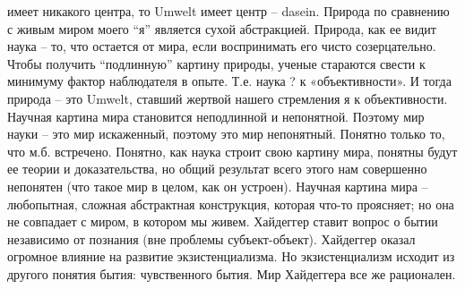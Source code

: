 \documentclass[12pt]{article}
\begin{document}
имеет никакого центра, то Umwelt имеет центр – dasein. Природа по сравнению с живым миром моего “я”
является сухой абстракцией. Природа, как ее видит наука – то, что остается от мира, если воспринимать его
чисто созерцательно. Чтобы получить “подлинную” картину природы, ученые стараются свести к минимуму
фактор наблюдателя в опыте. Т.е. наука ? к «объективности». И тогда природа – это Umwelt, ставший жертвой
нашего стремления я к объективности. Научная картина мира становится неподлинной и непонятной.
Поэтому мир науки – это мир искаженный, поэтому это мир непонятный. Понятно только то, что м.б. встречено.
Понятно, как наука строит свою картину мира, понятны будут ее теории и доказательства, но общий результат
всего этого нам совершенно непонятен (что такое мир в целом, как он устроен). Научная картина мира –
любопытная, сложная абстрактная конструкция, которая что-то проясняет; но она не совпадает с миром, в
котором мы живем.
Хайдеггер ставит вопрос о бытии независимо от познания (вне проблемы субъект-объект).
Хайдеггер оказал огромное влияние на развитие экзистенциализма. Но экзистенциализм исходит из другого
понятия бытия: чувственного бытия.
Мир Хайдеггера все же рационален.

\newpage
\end{document}

